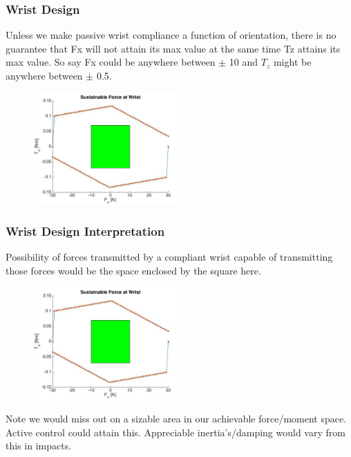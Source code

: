 \documentclass{beamer}
\begin{document}
\frame
{
\frametitle{ Wrist Design }

Unless we make passive wrist compliance a function of orientation, there is no guarantee that Fx will not attain its max value at the same time Tz attains its max value. 
So say Fx could be anywhere between $\pm$ 10 and $T_{z}$ might be anywhere between $\pm$ 0.5.

\begin{figure}[htb]
	\centering
	\includegraphics[width=2.25in]{images/WristCompliance2D.jpg}
	\caption{}
\end{figure}

}

\frame
{
\frametitle{ Wrist Design Interpretation }

Possibility of forces transmitted by a compliant wrist capable of transmitting those forces would be the space enclosed by the square here. 

\begin{figure}[htb]
	\centering
	\includegraphics[width=2.25in]{images/WristCompliance2D.jpg}
	\caption{}
\end{figure}

Note we would miss out on a sizable area in our achievable force/moment space. Active control could attain this. Appreciable inertia's/damping would vary from this in impacts. 

}
\end{document}
